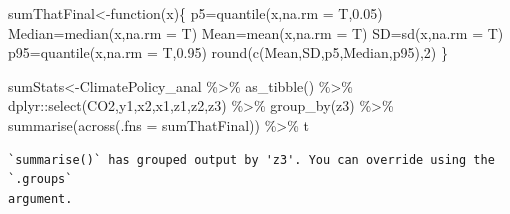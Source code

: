 \documentclass[
  letterpaper,
  DIV=11,
  numbers=noendperiod]{scrartcl}
\newenvironment{Shaded}{\begin{snugshade}}{\end{snugshade}}
\newcommand{\AttributeTok}[1]{\textcolor[rgb]{0.40,0.46,0.14}{#1}}
\newcommand{\ControlFlowTok}[1]{\textcolor[rgb]{0.00,0.46,0.62}{#1}}
\newcommand{\DecValTok}[1]{\textcolor[rgb]{0.68,0.00,0.00}{#1}}
\newcommand{\FloatTok}[1]{\textcolor[rgb]{0.68,0.00,0.00}{#1}}
\newcommand{\FunctionTok}[1]{\textcolor[rgb]{0.28,0.35,0.67}{#1}}
\newcommand{\NormalTok}[1]{\textcolor[rgb]{0.00,0.46,0.62}{#1}}
\newcommand{\OtherTok}[1]{\textcolor[rgb]{0.00,0.46,0.62}{#1}}
\newcommand{\SpecialCharTok}[1]{\textcolor[rgb]{0.37,0.37,0.37}{#1}}
\begin{document}
\begin{Shaded}
\begin{Highlighting}[]
\NormalTok{sumThatFinal}\OtherTok{\textless{}{-}}\ControlFlowTok{function}\NormalTok{(x)\{}
\NormalTok{  p5}\OtherTok{=}\FunctionTok{quantile}\NormalTok{(x,}\AttributeTok{na.rm =}\NormalTok{ T,}\FloatTok{0.05}\NormalTok{)}
\NormalTok{  Median}\OtherTok{=}\FunctionTok{median}\NormalTok{(x,}\AttributeTok{na.rm =}\NormalTok{ T)}
\NormalTok{  Mean}\OtherTok{=}\FunctionTok{mean}\NormalTok{(x,}\AttributeTok{na.rm =}\NormalTok{ T)}
\NormalTok{  SD}\OtherTok{=}\FunctionTok{sd}\NormalTok{(x,}\AttributeTok{na.rm =}\NormalTok{ T)}
\NormalTok{  p95}\OtherTok{=}\FunctionTok{quantile}\NormalTok{(x,}\AttributeTok{na.rm =}\NormalTok{ T,}\FloatTok{0.95}\NormalTok{)}
  \FunctionTok{round}\NormalTok{(}\FunctionTok{c}\NormalTok{(Mean,SD,p5,Median,p95),}\DecValTok{2}\NormalTok{)}
\NormalTok{\}}

\NormalTok{sumStats}\OtherTok{\textless{}{-}}\NormalTok{ClimatePolicy\_anal }\SpecialCharTok{\%\textgreater{}\%} 
  \FunctionTok{as\_tibble}\NormalTok{() }\SpecialCharTok{\%\textgreater{}\%}
\NormalTok{  dplyr}\SpecialCharTok{::}\FunctionTok{select}\NormalTok{(CO2,y1,x2,x1,z1,z2,z3) }\SpecialCharTok{\%\textgreater{}\%} 
  \FunctionTok{group\_by}\NormalTok{(z3) }\SpecialCharTok{\%\textgreater{}\%} 
  \FunctionTok{summarise}\NormalTok{(}\FunctionTok{across}\NormalTok{(}\AttributeTok{.fns =}\NormalTok{ sumThatFinal)) }\SpecialCharTok{\%\textgreater{}\%}\NormalTok{ t}
\end{Highlighting}
\end{Shaded}

\begin{verbatim}
`summarise()` has grouped output by 'z3'. You can override using the `.groups`
argument.
\end{verbatim}
\end{document}
